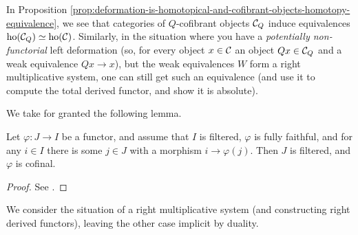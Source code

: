 In Proposition \ref{prop:deformation-is-homotopical-and-cofibrant-objects-homotopy-equivalence}, we see that categories of \(Q\)-cofibrant objects \(\mathcal{C}_Q\) induce equivalences
\(\operatorname{ho}(\mathcal{C}_Q)\simeq\operatorname{ho}(\mathcal{C})\). Similarly, in the situation where you have a \emph{potentially non-functorial} left deformation (so, for every object \(x\in\mathcal{C}\) an object \(Qx\in\mathcal{C}_Q\) and a weak equivalence
\(Qx\to x\)), but the weak equivalences \(W\) form a right multiplicative system, one can still get such an equivalence (and use it to compute the total derived functor, and show it is absolute).

We take for granted the following lemma.

\begin{lemma}
	Let \(\varphi\!:J\to I\) be a functor, and assume that \(I\) is filtered, \(\varphi\) is fully faithful, and for any \(i\in I\) there is some \(j\in J\) with a morphism \(i\to\varphi(j)\). Then
	\(J\) is filtered, and \(\varphi\) is cofinal.
\end{lemma}
\begin{proof}
See \cite[Prop.\ 3.2.4]{kashiwara-schapira-book}.
\end{proof}

We consider the situation of a right multiplicative system (and constructing right derived functors), leaving the other case implicit by duality.

